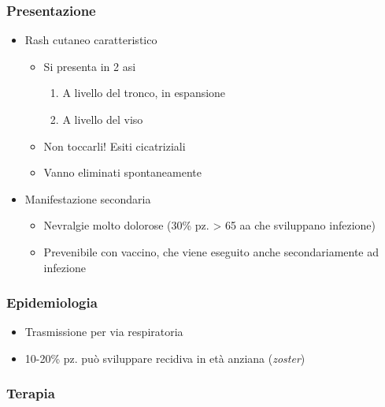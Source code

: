 \documentclass[italian,]{article}
\providecommand{\tightlist}{%
  \setlength{\itemsep}{0pt}\setlength{\parskip}{0pt}}
\begin{document}
\hypertarget{presentazione-1}{%
\subsubsection{Presentazione}\label{presentazione-1}}

\begin{itemize}
\tightlist
\item
  Rash cutaneo caratteristico

  \begin{itemize}
  \tightlist
  \item
    Si presenta in 2 asi

    \begin{enumerate}
    \def\labelenumi{\arabic{enumi}.}
    \tightlist
    \item
      A livello del tronco, in espansione
    \item
      A livello del viso
    \end{enumerate}
  \item
    Non toccarli! Esiti cicatriziali
  \item
    Vanno eliminati spontaneamente
  \end{itemize}
\item
  Manifestazione secondaria

  \begin{itemize}
  \tightlist
  \item
    Nevralgie molto dolorose (30\% pz. \textgreater{} 65 aa che
    sviluppano infezione)
  \item
    Prevenibile con vaccino, che viene eseguito anche secondariamente ad
    infezione
  \end{itemize}
\end{itemize}

\hypertarget{epidemiologia-8}{%
\subsubsection{Epidemiologia}\label{epidemiologia-8}}

\begin{itemize}
\tightlist
\item
  Trasmissione per via respiratoria
\item
  10-20\% pz. può sviluppare recidiva in età anziana (\emph{zoster})
\end{itemize}

\hypertarget{terapia-7}{%
\subsubsection{Terapia}\label{terapia-7}}
\end{document}
